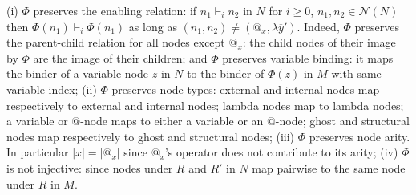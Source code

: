 \documentclass{elsarticle}
\theoremstyle{plain}
\theoremstyle{definition}
\newcommand\Nodes{\mathcal{N}}%
\newcommand{\enables}{\vdash} %
\begin{document}
    (i) $\Phi$ preserves the enabling relation: if $n_1 \enables_i n_2$ in $N$ for $i\geq 0$, $n_1,n_2 \in \Nodes(N)$ then $\Phi(n_1) \enables_i \Phi(n_1)$ as long as $(n_1,n_2) \neq (@_x,\lambda\overline{y}')$.
    Indeed, $\Phi$ preserves the parent-child relation for all nodes except $@_x$: the child nodes of their image by $\Phi$ are the image of their children;
    and $\Phi$ preserves variable binding: it maps the binder of a variable node $z$ in $N$ to the binder of $\Phi(z)$ in $M$ with same variable index;
%
    (ii) $\Phi$ preserves node types:
    external and internal nodes map respectively to external and internal nodes;
    lambda nodes map to lambda nodes;
    a variable or @-node maps to either a variable or an @-node;
    ghost and structural nodes map respectively to ghost and structural nodes;
%
    (iii) $\Phi$ preserves node arity. In particular $|x| = |@_x|$ since $@_x$'s operator does not contribute to its arity;
%
    (iv) $\Phi$ is not injective: since nodes under $R$ and $R'$ in $N$ map pairwise to the same node under $R$ in $M$.
\end{document}
